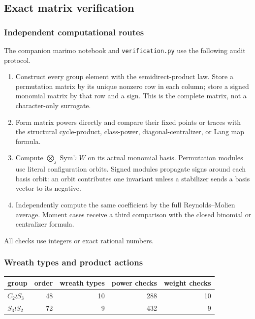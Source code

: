 \documentclass[10pt]{article}
\newcommand{\Sym}{\operatorname{Sym}}
\begin{document}
\subsection{Exact matrix verification}

\subsubsection{Independent computational routes}

The companion marimo notebook and \texttt{verification.py} use the following
audit protocol.
\begin{enumerate}
\item Construct every group element with the semidirect-product law.  Store a
permutation matrix by its unique nonzero row in each column; store a signed
monomial matrix by that row and a sign.  This is the complete matrix, not a
character-only surrogate.
\item Form matrix powers directly and compare their fixed points or traces
with the structural cycle-product, class-power, diagonal-centralizer, or Lang
map formula.
\item Compute $\bigotimes_j\Sym^{\tau_j}W$ on its actual monomial basis.
Permutation modules use literal configuration orbits.  Signed modules
propagate signs around each basis orbit: an orbit contributes one invariant
unless a stabilizer sends a basis vector to its negative.
\item Independently compute the same coefficient by the full Reynolds--Molien
average.  Moment cases receive a third comparison with the closed binomial or
centralizer formula.
\end{enumerate}
All checks use integers or exact rational numbers.

\subsubsection{Wreath types and product actions}

\begin{center}
\begin{tabular}{lrrrr}
\toprule
group & order & wreath types & power checks & weight checks\\
\midrule
$C_2\wr S_3$ & 48 & 10 & 288 & 10\\
$S_3\wr S_2$ & 72 & 9 & 432 & 9\\
\bottomrule
\end{tabular}
\end{center}
\end{document}
